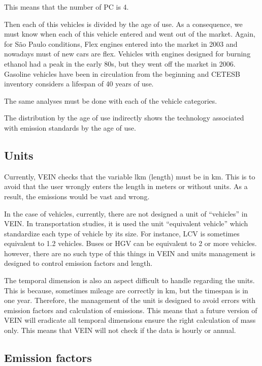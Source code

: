 \documentclass[12pt,graybox,envcountchap,sectrefs]{krantz}
\theoremstyle{definition}
\theoremstyle{definition}
\theoremstyle{definition}
\theoremstyle{remark}
\begin{document}
This means that the number of PC is 4.

Then each of this vehicles is divided by the age of use. As a
consequence, we must know when each of this vehicle entered and went out
of the market. Again, for São Paulo conditions, Flex engines entered
into the market in 2003 and nowadays must of new cars are flex. Vehicles
with engines designed for burning ethanol had a peak in the early 80s,
but they went off the market in 2006. Gasoline vehicles have been in
circulation from the beginning and CETESB inventory considers a lifespan
of 40 years of use.

The same analyses must be done with each of the vehicle categories.

The distribution by the age of use indirectly shows the technology
associated with emission standards by the age of use.

\subsection{Units}\label{units}

Currently, VEIN checks that the variable lkm (length) must be in km.
This is to avoid that the user wrongly enters the length in meters or
without units. As a result, the emissions would be vast and wrong.

In the case of vehicles, currently, there are not designed a unit of
``vehicles'' in VEIN. In transportation studies, it is used the unit
``equivalent vehicle'' which standardize each type of vehicle by its
size. For instance, LCV is sometimes equivalent to 1.2 vehicles. Buses
or HGV can be equivalent to 2 or more vehicles. however, there are no
such type of this things in VEIN and units management is designed to
control emission factors and length.

The temporal dimension is also an aspect difficult to handle regarding
the units. This is because, sometimes mileage are correctly in km, but
the timespan is in one year. Therefore, the management of the unit is
designed to avoid errors with emission factors and calculation of
emissions. This means that a future version of VEIN will eradicate all
temporal dimensions ensure the right calculation of mass only. This
means that VEIN will not check if the data is hourly or annual.

\subsection{Emission factors}\label{emission-factors-1}
\end{document}
